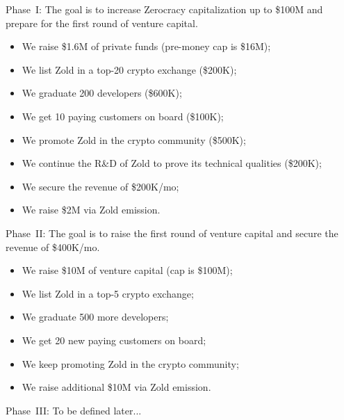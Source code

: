 \documentclass{main}
\begin{document}
Phase~I: The goal is to increase Zerocracy capitalization
up to \$100M and prepare for the first round of venture capital.

\begin{itemize}\itemsep0em
  \item We raise \$1.6M of private funds (pre-money cap is \$16M);
  \item We list Zold in a top-20 crypto exchange (\$200K);
  \item We graduate 200 developers (\$600K);
  \item We get 10 paying customers on board (\$100K);
  \item We promote Zold in the crypto community (\$500K);
  \item We continue the R\&D of Zold to prove its technical qualities (\$200K);
  \item We secure the revenue of \$200K/mo;
  \item We raise \$2M via Zold emission.
\end{itemize}

Phase~II: The goal is to raise the first round of venture capital and
secure the revenue of \$400K/mo.

\begin{itemize}\itemsep0em
  \item We raise \$10M of venture capital (cap is \$100M);
  \item We list Zold in a top-5 crypto exchange;
  \item We graduate 500 more developers;
  \item We get 20 new paying customers on board;
  \item We keep promoting Zold in the crypto community;
  \item We raise additional \$10M via Zold emission.
\end{itemize}

Phase~III: To be defined later...
\end{document}
